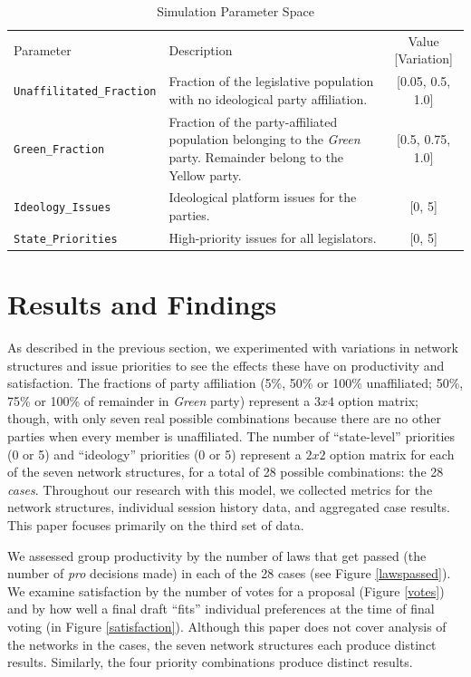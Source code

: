 \documentclass[pdftex,12pt]{llncs}
\begin{document}
\begin{table}
 \caption{Simulation Parameter Space}
 \begin{tabular}{lp{2.25in}c}
 \hline\noalign{\smallskip}
 Parameter & Description & Value [Variation] \\
 \noalign{\smallskip}
 \hline
 \noalign{\smallskip}
 \texttt{Unaffilitated\_Fraction} & Fraction of the legislative population with no ideological party  affiliation. & [0.05, 0.5, 1.0] \\
 \texttt{Green\_Fraction} & Fraction of the party-affiliated population belonging to the \textit{Green} party. Remainder belong to the Yellow party. & [0.5, 0.75, 1.0] \\
 \texttt{Ideology\_Issues} & Ideological platform issues for the parties. & [0, 5] \\
 \texttt{State\_Priorities} & High-priority issues for all legislators. & [0, 5] \\
 \hline
 \end{tabular}
 \label{params}
\end{table}


\section{Results and Findings}
%
As described in the previous section, we experimented with variations in network structures and issue priorities to see the effects these have on productivity and satisfaction.
The fractions of party affiliation (5\%, 50\% or 100\% unaffiliated; 50\%, 75\% or 100\% of remainder in \textit{Green} party) represent a $3 x 4$ option matrix; though, with only seven real possible combinations because there are no other parties when every member is unaffiliated. 
The number of ``state-level'' priorities (0 or 5) and ``ideology'' priorities (0 or 5) represent a $2 x 2$ option matrix for each of the seven network structures, for a total of 28 possible combinations: the 28 \textit{cases}.
Throughout our research with this model, we collected metrics for the network structures, individual session history data, and aggregated case results.
This paper focuses primarily on the third set of data. 

We assessed group productivity by the number of laws that get passed (the number of \textit{pro} decisions made) in each of the 28 cases (see Figure \ref{lawspassed}). 
We examine satisfaction by the number of votes for a proposal (Figure \ref{votes}) and by how well a final draft ``fits'' individual preferences at the time of final voting (in Figure \ref{satisfaction}). 
Although this paper does not cover analysis of the networks in the cases, the seven network structures each produce distinct results.
Similarly, the four priority combinations produce distinct results. 
\end{document}
